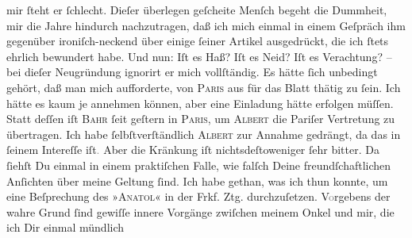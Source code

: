 \begin{ledgroupsized}[t]{13cm}
               mir ſteht er ſchlecht. Dieſer überlegen geſcheite Menſch begeht die Dummheit, mir die Jahre hindurch
               nachzutragen, daß ich mich einmal in einem Geſpräch  ihm gegenüber ironiſch-neckend über einige ſeiner Artikel ausgedrückt,
               die ich ſtets ehrlich bewundert habe. Und nun: Iſt es Haß? Iſt es Neid? Iſt es
               Verachtung? – bei dieſer Neugründung ignorirt er mich vollſtändig. Es hätte {\pb}ſich unbedingt gehört, daß man mich aufforderte, von
                  \textsc{Paris} aus für das Blatt thätig
               zu ſein. Ich hätte es kaum je annehmen können, aber eine Einladung hätte erfolgen
               müſſen. Statt deſſen iſt \textsc{Bahr} ſeit geſtern in \textsc{Paris}, um \textsc{Albert} die Pariſer Vertretung zu übertragen. Ich
               habe ſelbſtverſtändlich \textsc{Albert} zur Annahme gedrängt, da das in ſeinem Intereſſe iſt\textcolor{gray}{.} Aber
               die Kränkung iſt nichtsdeſtoweniger ſehr bitter. Da ſiehſt Du einmal in einem
               praktiſchen Falle, wie falſch Deine freundſchaftlichen Anſichten über meine Geltung
               ſind.\pend
           \pstart
           {\pb}Ich habe gethan, was ich thun konnte, um eine
               Beſprechung des »\textsc{Anatol}« in der Frkf. Ztg. durchzuſetzen.
                  V\textcolor{gray}{o}rgebens der wahre Grund ſind gewiſſe  innere Vorgänge zwiſchen meinem Onkel und mir, die ich Dir einmal mündlich

\end{ledgroupsized}
